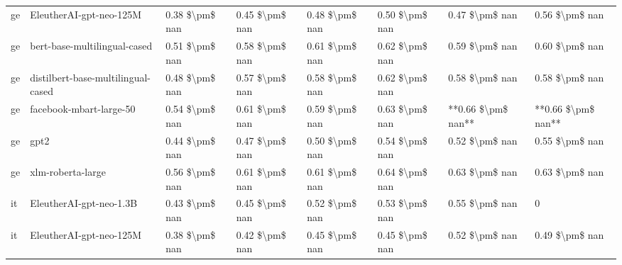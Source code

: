 \begin{tabular}{llllllll}
      ge &            EleutherAI-gpt-neo-125M & 0.38 \$\textbackslash pm\$ nan &            0.45 \$\textbackslash pm\$ nan &        0.48 \$\textbackslash pm\$ nan &         0.50 \$\textbackslash pm\$ nan &                          0.47 \$\textbackslash pm\$ nan &     0.56 \$\textbackslash pm\$ nan \\
      ge &       bert-base-multilingual-cased & 0.51 \$\textbackslash pm\$ nan &            0.58 \$\textbackslash pm\$ nan &        0.61 \$\textbackslash pm\$ nan &         0.62 \$\textbackslash pm\$ nan &                          0.59 \$\textbackslash pm\$ nan &     0.60 \$\textbackslash pm\$ nan \\
      ge & distilbert-base-multilingual-cased & 0.48 \$\textbackslash pm\$ nan &            0.57 \$\textbackslash pm\$ nan &        0.58 \$\textbackslash pm\$ nan &         0.62 \$\textbackslash pm\$ nan &                          0.58 \$\textbackslash pm\$ nan &     0.58 \$\textbackslash pm\$ nan \\
      ge &            facebook-mbart-large-50 & 0.54 \$\textbackslash pm\$ nan &            0.61 \$\textbackslash pm\$ nan &        0.59 \$\textbackslash pm\$ nan &         0.63 \$\textbackslash pm\$ nan &                      **0.66 \$\textbackslash pm\$ nan** & **0.66 \$\textbackslash pm\$ nan** \\
      ge &                               gpt2 & 0.44 \$\textbackslash pm\$ nan &            0.47 \$\textbackslash pm\$ nan &        0.50 \$\textbackslash pm\$ nan &         0.54 \$\textbackslash pm\$ nan &                          0.52 \$\textbackslash pm\$ nan &     0.55 \$\textbackslash pm\$ nan \\
      ge &                  xlm-roberta-large & 0.56 \$\textbackslash pm\$ nan &            0.61 \$\textbackslash pm\$ nan &        0.61 \$\textbackslash pm\$ nan &         0.64 \$\textbackslash pm\$ nan &                          0.63 \$\textbackslash pm\$ nan &     0.63 \$\textbackslash pm\$ nan \\
      it &            EleutherAI-gpt-neo-1.3B & 0.43 \$\textbackslash pm\$ nan &            0.45 \$\textbackslash pm\$ nan &        0.52 \$\textbackslash pm\$ nan &         0.53 \$\textbackslash pm\$ nan &                          0.55 \$\textbackslash pm\$ nan &                  0 \\
      it &            EleutherAI-gpt-neo-125M & 0.38 \$\textbackslash pm\$ nan &            0.42 \$\textbackslash pm\$ nan &        0.45 \$\textbackslash pm\$ nan &         0.45 \$\textbackslash pm\$ nan &                          0.52 \$\textbackslash pm\$ nan &     0.49 \$\textbackslash pm\$ nan \\

\end{tabular}

